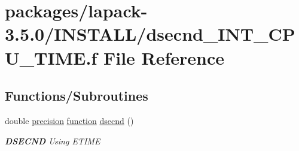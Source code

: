 \hypertarget{dsecnd__INT__CPU__TIME_8f}{}\section{packages/lapack-\/3.5.0/\+I\+N\+S\+T\+A\+L\+L/dsecnd\+\_\+\+I\+N\+T\+\_\+\+C\+P\+U\+\_\+\+T\+I\+M\+E.f File Reference}
\label{dsecnd__INT__CPU__TIME_8f}
\subsection*{Functions/\+Subroutines}
\begin{DoxyCompactItemize}
\item 
double \hyperlink{numinquire_8h_a2c8e616467665d0b2814d4c1589ba74e}{precision} \hyperlink{afunc_8m_a7b5e596df91eadea6c537c0825e894a7}{function} \hyperlink{group__auxOTHERauxiliary_gafe21a6b76340ac0afd7f0f84326e7918}{dsecnd} ()
\begin{DoxyCompactList}\small\item\em {\bfseries D\+S\+E\+C\+N\+D} Using E\+T\+I\+M\+E \end{DoxyCompactList}\end{DoxyCompactItemize}
